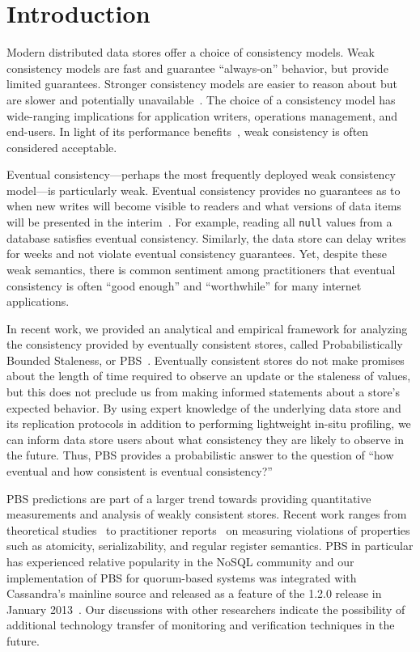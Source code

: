 \section{Introduction}

Modern distributed data stores offer a choice of consistency
models. Weak consistency models are fast and guarantee ``always-on''
behavior, but provide limited guarantees. Stronger consistency models
are easier to reason about but are slower and potentially
unavailable~\cite{davidson-survey}. The choice of a consistency model has
wide-ranging implications for application writers, operations
management, and end-users.  In light of its performance
benefits~\cite{abadi-pacelc}, weak consistency is often considered
acceptable.

Eventual consistency---perhaps the most frequently deployed weak
consistency model---is particularly weak. Eventual consistency
provides no guarantees as to when new writes will become visible to
readers and what versions of data items will be presented in the
interim~\cite{vogels-defs}. For example, reading all \texttt{null}
values from a database satisfies eventual consistency. Similarly, the
data store can delay writes for weeks and not violate eventual
consistency guarantees. Yet, despite these weak semantics, there is
common sentiment among practitioners that eventual consistency is
often ``good enough'' and ``worthwhile'' for many internet
applications.

In recent work, we provided an analytical and empirical framework for
analyzing the consistency provided by eventually consistent stores,
called Probabilistically Bounded Staleness, or
PBS~\cite{pbs-vldb2012}. Eventually consistent stores do not make
promises about the length of time required to observe an update or the
staleness of values, but this does not preclude us from making
informed statements about a store's expected behavior. By using expert
knowledge of the underlying data store and its replication protocols
in addition to performing lightweight in-situ profiling, we can inform
data store users about what consistency they are likely to observe in
the future. Thus, PBS provides a probabilistic answer to the question
of ``how eventual and how consistent is eventual consistency?''

PBS predictions are part of a larger trend towards providing
quantitative measurements and analysis of weakly consistent
stores. Recent work ranges from theoretical studies~\cite{podc-hpl} to
practitioner reports~\cite{hotdep} on measuring violations of
properties such as atomicity, serializability, and regular register
semantics. PBS in particular has experienced relative popularity in
the NoSQL community and our implementation of PBS for quorum-based
systems was integrated with Cassandra's mainline source and released
as a feature of the 1.2.0 release in January
2013~\cite{cassandra-pbs-patch}. Our discussions with other
researchers indicate the possibility of additional technology
transfer of monitoring and verification techniques in the future.

